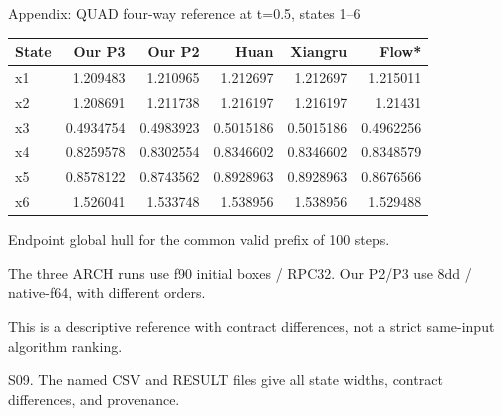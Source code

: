 \documentclass[aspectratio=169,11pt]{beamer}
\newcommand{\src}[1]{\par\vfill{\fontsize{7}{9}\selectfont\color{gray}#1\par}}
\begin{document}
\begin{frame}[t]{Appendix: QUAD four-way reference at t=0.5, states 1–6}
\relax
\relax
{\footnotesize\setlength{\tabcolsep}{3.2pt}\renewcommand{\arraystretch}{1.18}
\noindent\begin{tabular*}{\linewidth}{@{\extracolsep{\fill}}lrrrrr@{}}\toprule
\textbf{State} & \textbf{Our P3} & \textbf{Our P2} & \textbf{Huan} & \textbf{Xiangru} & \textbf{Flow*}\\ \midrule
x1 & 1.209483 & 1.210965 & 1.212697 & 1.212697 & 1.215011\\
x2 & 1.208691 & 1.211738 & 1.216197 & 1.216197 & 1.21431\\
x3 & 0.4934754 & 0.4983923 & 0.5015186 & 0.5015186 & 0.4962256\\
x4 & 0.8259578 & 0.8302554 & 0.8346602 & 0.8346602 & 0.8348579\\
x5 & 0.8578122 & 0.8743562 & 0.8928963 & 0.8928963 & 0.8676566\\
x6 & 1.526041 & 1.533748 & 1.538956 & 1.538956 & 1.529488\\
\bottomrule\end{tabular*}\par{}}\vspace{0.35cm}Endpoint global hull for the common valid prefix of 100 steps.\par{}The three ARCH runs use f90 initial boxes / RPC32. Our P2/P3 use 8dd / native-f64, with different orders.\par{}This is a descriptive reference with contract differences, not a strict same-input algorithm ranking.
\src{S09. The named CSV and RESULT files give all state widths, contract differences, and provenance.}
\end{frame}
\end{document}
